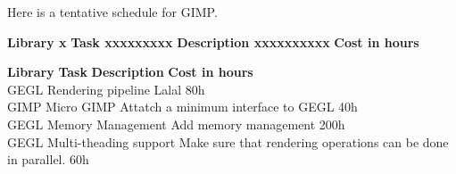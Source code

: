 Here is a tentative schedule for GIMP.

\begin{tabbing}
{\bf \large Library x} \= {\bf \large Task xxxxxxxxx} \= {\bf \large Description xxxxxxxxxx}	\= {\bf \large Cost in hours} \kill

{\bf \large Library} \> {\bf \large Task} \> {\bf \large Description} \> {\bf \large Cost in hours}\\

GEGL	\> Rendering pipeline		\>Lalal		
\>80h\\
GIMP	\> Micro GIMP			\> Attatch a minimum interface to GEGL
\>40h\\
GEGL	\> Memory Management		\> Add memory management 
\>200h\\
GEGL	\> Multi-theading support	\> Make sure that rendering operations
					can be done in parallel.
\>60h\\
\end{tabbing}
			
